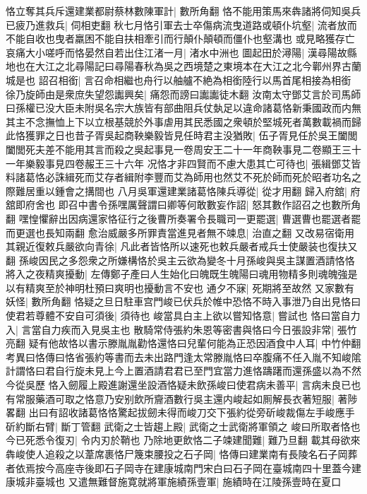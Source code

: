 恪立奪其兵斥還建業都尉蔡林數陳軍計|{
	數所角翻}
恪不能用策馬來犇諸將伺知吳兵已疲乃進救兵|{
	伺相吏翻}
秋七月恪引軍去士卒傷病流曳道路或頓仆坑壑|{
	流者放而不能自收也曳者羸困不能自扶相牽引而行顛仆顛頓而僵仆也壑溝也}
或見略獲存亡哀痛大小嗟呼而恪晏然自若出住江渚一月|{
	渚水中洲也}
圖起田於潯陽|{
	漢尋陽故縣地也在大江之北尋陽記曰尋陽春秋為吳之西境楚之東境本在大江之北今鄿州界古蘭城是也}
詔召相銜|{
	言召命相繼也舟行以舳艫不絶為相銜陸行以馬首尾相接為相銜}
徐乃旋師由是衆庶失望怨讟興矣|{
	痛怨而謗曰讟讟徒木翻}
汝南太守鄧艾言於司馬師曰孫權已没大臣未附吳名宗大族皆有部曲阻兵仗埶足以違命諸葛恪新秉國政而内無其主不念撫恤上下以立根基競於外事虐用其民悉國之衆頓於堅城死者萬數載禍而歸此恪獲罪之日也昔子胥吳起商鞅樂毅皆見任時君主没猶敗|{
	伍子胥見任於吳王闔閭闔閭死夫差不能用其言而殺之吳起事見一卷周安王二十一年商鞅事見二卷顯王三十一年樂毅事見四卷赧王三十六年}
况恪才非四賢而不慮大患其亡可待也|{
	張緝鄧艾皆料諸葛恪必誅緝死而艾存者緝附李豐而艾為師用也然艾不死於師而死於昭者功名之際難居重以鍾會之搆間也}
八月吳軍還建業諸葛恪陳兵導從|{
	從才用翻}
歸入府舘|{
	府舘即府舍也}
即召中書令孫嘿厲聲謂曰卿等何敢數妄作詔|{
	怒其數作詔召之也數所角翻}
嘿惶懼辭出因病還家恪征行之後曹所奏署令長職司一更罷選|{
	曹選曹也罷選者罷而更選也長知兩翻}
愈治威嚴多所罪責當進見者無不竦息|{
	治直之翻}
又改易宿衛用其親近復敕兵嚴欲向青徐|{
	凡此者皆恪所以速死也敕兵嚴者戒兵士使嚴装也復扶又翻}
孫峻因民之多怨衆之所嫌構恪於吳主云欲為變冬十月孫峻與吳主謀置酒請恪恪將入之夜精爽擾動|{
	左傳鄭子產曰人生始化曰魄既生魄陽曰魂用物精多則魂魄強是以有精爽至於神明杜預曰爽明也擾動言不安也}
通夕不寐|{
	死期將至故然}
又家數有妖怪|{
	數所角翻}
恪疑之旦日駐車宫門峻已伏兵於帷中恐恪不時入事泄乃自出見恪曰使君若尊體不安自可須後|{
	須待也}
峻當具白主上欲以嘗知恪意|{
	嘗試也}
恪曰當自力入|{
	言當自力疾而入見吳主也}
散騎常侍張約朱恩等密書與恪曰今日張設非常|{
	張竹亮翻}
疑有他故恪以書示滕胤胤勸恪還恪曰兒輩何能為正恐因酒食中人耳|{
	中竹仲翻　考異曰恪傳曰恪省張約等書而去未出路門逢太常滕胤恪曰卒腹痛不任入胤不知峻隂計謂恪曰君自行旋未見上今上置酒請君君已至門宜當力進恪躊躇而還孫盛以為不然今從吳歷}
恪入劒履上殿進謝還坐設酒恪疑未飲孫峻曰使君病未善平|{
	言病未良已也}
有常服藥酒可取之恪意乃安别飲所齎酒數行吳主還内峻起如厠解長衣著短服|{
	著陟畧翻}
出曰有詔收諸葛恪恪驚起拔劒未得而峻刀交下張約從旁斫峻裁傷左手峻應手斫約斷右臂|{
	斷丁管翻}
武衛之士皆趨上殿|{
	武衛之士武衛將軍領之}
峻曰所取者恪也今已死悉令復刃|{
	令内刃於鞘也}
乃除地更飲恪二子竦建聞難|{
	難乃旦翻}
載其母欲來犇峻使人追殺之以葦席裹恪尸篾束腰投之石子岡|{
	恪傳曰建業南有長陵名石子岡葬者依焉按今高座寺後即石子岡寺在建康城南門宋白曰石子岡在臺城南四十里蓋今建康城非臺城也}
又遣無難督施寛就將軍施績孫壹軍|{
	施績時在江陵孫壹時在夏口}
